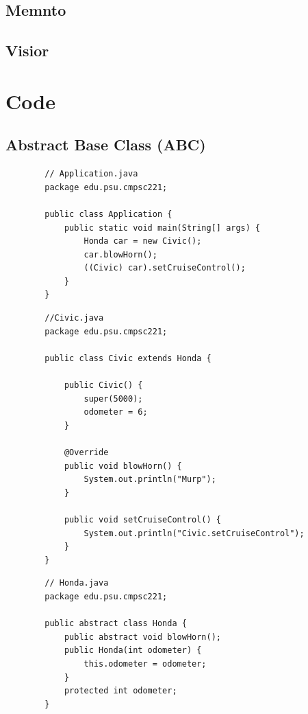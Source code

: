 \documentclass[a4paper, 11pt]{article}
\begin{document}
    \subsection{Memnto}

    \subsection{Visior}

\newpage

\section{Code}

    \subsection{Abstract Base Class (ABC)}
        \begin{lstlisting}
        // Application.java
        package edu.psu.cmpsc221;

        public class Application {
            public static void main(String[] args) {
                Honda car = new Civic();
                car.blowHorn();
                ((Civic) car).setCruiseControl();
            }
        }
        \end{lstlisting}

        \begin{lstlisting}
        //Civic.java
        package edu.psu.cmpsc221;

        public class Civic extends Honda {

            public Civic() {
                super(5000);
                odometer = 6;
            }

            @Override
            public void blowHorn() {
                System.out.println("Murp");
            }

            public void setCruiseControl() {
                System.out.println("Civic.setCruiseControl");
            }
        }
        \end{lstlisting}

        \begin{lstlisting}
        // Honda.java
        package edu.psu.cmpsc221;

        public abstract class Honda {
            public abstract void blowHorn();
            public Honda(int odometer) {
                this.odometer = odometer;
            }
            protected int odometer;
        }
        \end{lstlisting}
\end{document}
